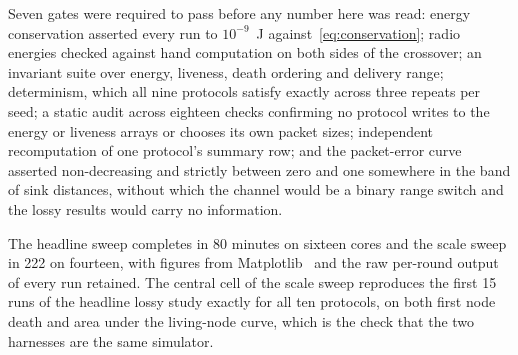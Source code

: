 Seven gates were required to pass before any number here was read: energy
conservation asserted every run to $10^{-9}$~J against~\eqref{eq:conservation};
radio energies checked against hand computation on both sides of the crossover;
an invariant suite over energy, liveness, death ordering and delivery range;
determinism, which all nine protocols satisfy exactly across three repeats per
seed; a static audit across eighteen checks confirming no protocol writes to the
energy or liveness arrays or chooses its own packet sizes; independent
recomputation of one protocol's summary row; and the packet-error curve asserted
non-decreasing and strictly between zero and one somewhere in the band of sink
distances, without which the channel would be a binary range switch and the
lossy results would carry no information.

The headline sweep completes in 80 minutes on sixteen cores and the scale sweep
in 222 on fourteen, with figures from Matplotlib~\cite{hunter2007matplotlib} and
the raw per-round output of every run retained. The central cell of the scale
sweep reproduces the first 15 runs of the headline lossy study exactly for all
ten protocols, on both first node death and area under the living-node curve,
which is the check that the two harnesses are the same simulator.
